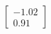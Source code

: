 \documentclass[preview]{standalone}
\begin{document}
\begin{align*}
\begin{bmatrix} -1.02 \\ 0.91 \end{bmatrix}
\end{align*}
\end{document}
